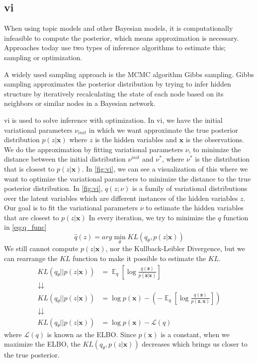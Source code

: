 \subsection{\acrlong{vi}}
When using topic models and other Bayesian models, it is computationally infeasible to compute the posterior, which means approximation is necessary. 
Approaches today use two types of inference algorithms to estimate this; sampling or optimization.

A widely used sampling approach is the MCMC algorithm Gibbs sampling.
Gibbs sampling approximates the posterior distribution by trying to infer hidden structure by iteratively recalculating the state of each node based on its neighbors or similar nodes in a Bayesian network.

\gls{vi} is used to solve inference with optimization.
In \gls{vi}, we have the initial variational parameters $\nu_{init}$ in which we want approximate the true posterior distribution $p(z|\textbf{x})$ where $z$ is the hidden variables and $\textbf{x}$ is the observations.
We do the approximation by fitting variational parameters $\nu$, to minimize the distance between the initial distribution $\nu^{init}$ and $\nu^*$, where $\nu^*$ is the distribution that is closest to $p(z|\textbf{x})$.
In \autoref{fig:vi}, we can see a visualization of this where we want to optimize the variational parameters to minimize the distance to the true posterior distribution.
In \autoref{fig:vi}, $q(z; \nu)$ is a family of variational distributions over the latent variables which are different instances of the hidden variables $z$.
Our goal is to fit the variational parameters $\nu$ to estimate the hidden variables that are closest to $p(z|\textbf{x})$
In every iteration, we try to minimize the $q$ function in \autoref{eq:q_func} 
\begin{equation}\label{eq:q_func}
	\hat{q}(z) = arg \min_{\theta} K\!L(q_\theta, p(z|\textbf{x}))
\end{equation}
We still cannot compute $p(z|\textbf{x})$, nor the Kullback-Leibler Divergence, but we can rearrange the $K\!L$ function to make it possible to estimate the $K\!L$.
\begin{align}
	K\!L(q_\theta || p(z|\textbf{x})) &= \mathop{\mathbb{E}}_{q}[\log\frac{q(\textbf{z})}{p(\textbf{z}|\textbf{x})}]\\
	\downdownarrows \nonumber \\
	K\!L(q_\theta || p(z|\textbf{x})) &= \log p(\textbf{x}) - (-\mathop{\mathbb{E}}_{q}[\log\frac{q(\textbf{z})}{p(\textbf{z},\textbf{x})}]) \\
	\downdownarrows \nonumber \\
	K\!L(q_\theta || p(z|\textbf{x})) &= \log p(\textbf{x}) - \mathcal{L}(q)
\end{align}
where $\mathcal{L}(q)$ is known as the ELBO.
Since $p(\textbf{x})$ is a constant, when we maximize the ELBO, the $K\!L(q_\theta, p(z|\textbf{x}))$ decreases which brings us closer to the true posterior.

